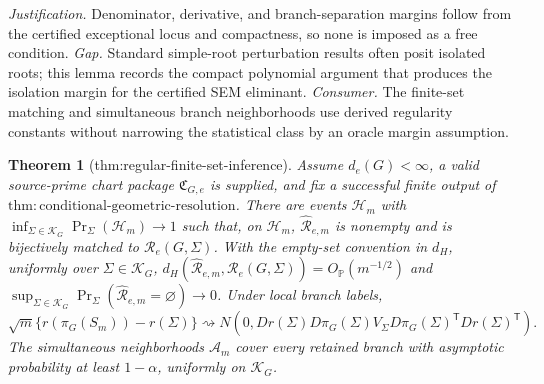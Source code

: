 \documentclass{article}
\newtheorem{theorem}{Theorem}
\begin{document}
\par\smallskip\noindent \textit{Justification.} Denominator, derivative, and branch-separation margins follow from the certified exceptional locus and compactness, so none is imposed as a free condition. \textit{Gap.} Standard simple-root perturbation results often posit isolated roots; this lemma records the compact polynomial argument that produces the isolation margin for the certified SEM eliminant. \textit{Consumer.} The finite-set matching and simultaneous branch neighborhoods use derived regularity constants without narrowing the statistical class by an oracle margin assumption.

\begin{theorem}[thm:regular-finite-set-inference]\label{thm:regular-finite-set-inference}
Assume \(d_e(G)<\infty\), a valid source-prime chart package \(\mathfrak C_{G,e}\) is supplied, and fix a successful finite output of \(\mathrm{thm:conditional\mbox{-}geometric\mbox{-}resolution}\). There are events \(\mathcal H_m\) with \(\inf_{\Sigma\in\mathcal K_G}\Pr_{\Sigma}(\mathcal H_m)\to1\) such that, on \(\mathcal H_m\), \(\widehat{\mathcal R}_{e,m}\) is nonempty and is bijectively matched to \(\mathcal R_e(G,\Sigma)\). With the empty-set convention in \(d_H\), uniformly over \(\Sigma\in\mathcal K_G\), \(d_H(\widehat{\mathcal R}_{e,m},\mathcal R_e(G,\Sigma))=O_{\mathbb P}(m^{-1/2})\) and \(\sup_{\Sigma\in\mathcal K_G}\Pr_{\Sigma}(\widehat{\mathcal R}_{e,m}=\varnothing)\to0\). Under local branch labels,
\[
\sqrt m\{r(\pi_G(S_m))-r(\Sigma)\}\rightsquigarrow N\!\left(0,Dr(\Sigma)D\pi_G(\Sigma)V_\Sigma D\pi_G(\Sigma)^{\mathsf T}Dr(\Sigma)^{\mathsf T}\right).
\]
The simultaneous neighborhoods \(\mathcal A_m\) cover every retained branch with asymptotic probability at least \(1-\alpha\), uniformly on \(\mathcal K_G\).
\end{theorem}
\end{document}
